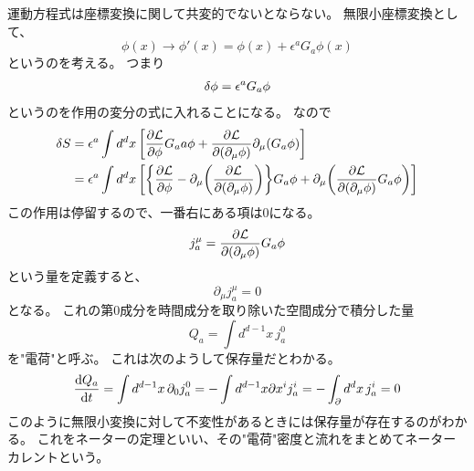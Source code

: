 \documentclass[../../master.tex]{subfiles}
\begin{document}
運動方程式は座標変換に関して共変的でないとならない。
無限小座標変換として、
\begin{equation}
    \phi(x) \rightarrow \phi'(x) = \phi(x) + \epsilon^a G_a \phi(x)
\end{equation}
というのを考える。
つまり
\begin{align*}
    \var{\phi}=\epsilon^a G_a \phi
\end{align*}
というのを作用の変分の式に入れることになる。
なので
\begin{align}
    \var{S}
    &= \epsilon^a \int d^d x\, \qty[\pdv{\mathcal{L}}{\phi}G_aa\phi+\pdv{\mathcal{L}}{(\partial_\mu \phi)}\partial_\mu (G_a\phi)] \notag\\
    &= \epsilon^a  \int d^d x\, \qty[
            \qty{\pdv{\mathcal{L}}{\phi}
            -\partial_\mu\qty(\pdv{\mathcal{L}}{(\partial_\mu \phi)})}G_a\phi
            +\partial_\mu\qty(\pdv{\mathcal{L}}{(\partial_\mu\phi)}G_a \phi)
        ]
\end{align}
この作用は停留するので、一番右にある項は0になる。
\begin{equation}
    j_a^\mu=\pdv{\mathcal{L}}{(\partial_\mu\phi)}G_a\phi
\end{equation}
という量を定義すると、
\begin{equation}
    \partial_\mu j_a^\mu =0
\end{equation}
となる。
これの第0成分を時間成分を取り除いた空間成分で積分した量
\begin{equation}
    Q_a = \int d^{d-1}x \,j_a^0
\end{equation}
を"電荷"と呼ぶ。
これは次のようして保存量だとわかる。
\begin{equation}
    \dv{Q_a}{t} = \int d^{d-1}x\, \partial_{0}j_a^0 = -\int d^{d-1}x \partial{x^i}j_a^i = -\int_\partial d^dx\,j_a^i =0
\end{equation}
このように無限小変換に対して不変性があるときには保存量が存在するのがわかる。
これをネーターの定理といい、その"電荷"密度と流れをまとめてネーターカレントという。
\end{document}
